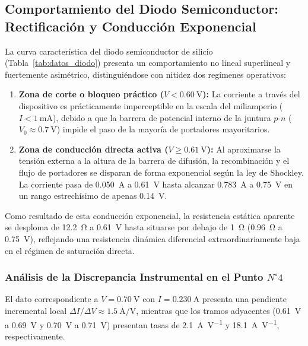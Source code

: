 \subsection{Comportamiento del Diodo Semiconductor: Rectificación y Conducción Exponencial}
La curva característica del diodo semiconductor de silicio (Tabla~\ref{tab:datos_diodo}) presenta un comportamiento no lineal superlineal y fuertemente asimétrico, distinguiéndose con nitidez dos regímenes operativos:
\begin{enumerate}
    \item \textbf{Zona de corte o bloqueo práctico ($V < \qty{0,60}{\volt}$):} La corriente a través del dispositivo es prácticamente imperceptible en la escala del miliamperio ($I < \qty{1}{\milli\ampere}$), debido a que la barrera de potencial interno de la juntura $p$-$n$ ($V_0 \approx \qty{0,7}{\volt}$) impide el paso de la mayoría de portadores mayoritarios.
    \item \textbf{Zona de conducción directa activa ($V \ge \qty{0,61}{\volt}$):} Al aproximarse la tensión externa a la altura de la barrera de difusión, la recombinación y el flujo de portadores se disparan de forma exponencial según la ley de Shockley. La corriente pasa de \qty{0,050}{\ampere} a \qty{0,61}{\volt} hasta alcanzar \qty{0,783}{\ampere} a \qty{0,75}{\volt} en un rango estrechísimo de apenas \qty{0,14}{\volt}.
\end{enumerate}

Como resultado de esta conducción exponencial, la resistencia estática aparente se desploma de \qty{12,2}{\ohm} a \qty{0,61}{\volt} hasta situarse por debajo de \qty{1}{\ohm} (\qty{0,96}{\ohm} a \qty{0,75}{\volt}), reflejando una resistencia dinámica diferencial extraordinariamente baja en el régimen de saturación directa.

\subsubsection{Análisis de la Discrepancia Instrumental en el Punto \texorpdfstring{$N^\circ 4$}{N. 4}}
El dato correspondiente a $V = \qty{0,70}{\volt}$ con $I = \qty{0,230}{\ampere}$ presenta una pendiente incremental local $\Delta I / \Delta V \approx \qty{1,5}{\ampere\per\volt}$, mientras que los tramos adyacentes (\qty{0,61}{\volt} a \qty{0,69}{\volt} y \qty{0,70}{\volt} a \qty{0,71}{\volt}) presentan tasas de \qty{2,1}{\ampere\per\volt} y \qty{18,1}{\ampere\per\volt}, respectivamente. 

